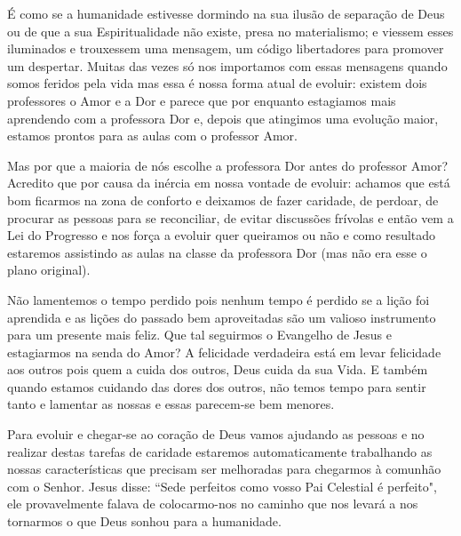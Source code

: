 \emdash{}É como se a humanidade estivesse dormindo na sua ilusão de separação de Deus ou de que a sua Espiritualidade não existe, presa no materialismo; e viessem esses iluminados e trouxessem uma mensagem, um código libertadores para promover um despertar. Muitas das vezes só nos importamos com essas mensagens quando somos feridos pela vida mas essa é nossa forma atual de evoluir: existem dois professores o Amor e a Dor e parece que por enquanto estagiamos mais aprendendo com a professora Dor e, depois que atingimos uma evolução maior, estamos prontos para as aulas com o professor Amor.

\emdash{}Mas por que a maioria de nós escolhe a professora Dor antes do professor Amor? Acredito que por causa da inércia em nossa vontade de evoluir: achamos que está bom ficarmos na zona de conforto e deixamos de fazer caridade, de perdoar, de procurar as pessoas para se reconciliar, de evitar discussões frívolas e então vem a Lei do Progresso e nos força a evoluir quer queiramos ou não e como resultado estaremos assistindo as aulas na classe da professora Dor (mas não era esse o plano original).

\emdash{}Não lamentemos o tempo perdido pois nenhum tempo é perdido se a lição foi aprendida e as lições do passado bem aproveitadas são um valioso instrumento para um presente mais feliz. Que tal seguirmos o Evangelho de Jesus e estagiarmos na senda do Amor? A felicidade verdadeira está em levar felicidade aos outros pois quem a cuida dos outros, Deus cuida da sua Vida. E também quando estamos cuidando das dores dos outros, não temos tempo para sentir tanto e lamentar as nossas e essas parecem-se bem menores.

\emdash{}Para evoluir e chegar-se ao coração de Deus vamos ajudando as pessoas e no realizar destas tarefas de caridade estaremos automaticamente trabalhando as nossas características que precisam ser melhoradas para chegarmos à comunhão com o Senhor. Jesus disse: ``Sede perfeitos como vosso Pai Celestial é perfeito", ele provavelmente falava de colocarmo-nos no caminho que nos levará a nos tornarmos o que Deus sonhou para a humanidade.